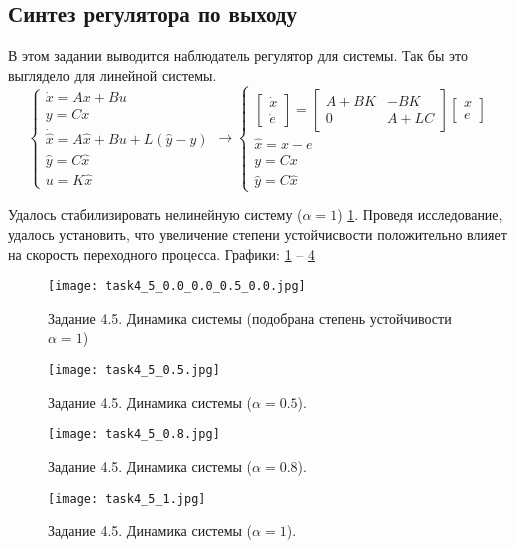 \subsection{Синтез регулятора по выходу}
В этом задании выводится наблюдатель регулятор для системы. Так бы это выглядело для линейной системы.
\[
        \begin{cases}
                \dot{x} = A x + B u\\
                y = C x \\
                \dot{\hat{x}} = A \hat{x} + B u + L(\hat{y} - y) \\
                \hat{y} = C \hat{x} \\
                u = K \hat{x}
        \end{cases} \rightarrow
        \begin{cases}
            \begin{bmatrix} 
                \dot{x} \\
                \dot{e}
            \end{bmatrix} = 
            \begin{bmatrix} 
                A + BK & -BK\\
                0 & A + LC
            \end{bmatrix}
            \begin{bmatrix} 
              x \\
              e
          \end{bmatrix} 
            \\
            \hat{x} = x - e \\
            y = Cx \\
            \hat{y} = C \hat{x}
         \end{cases}
\]

Удалось стабилизировать нелинейную систему ($\alpha = 1$) \ref{fig:task4_5}.
Проведя исследование, удалось установить, что увеличение степени устойчисвости положительно влияет на скорость переходного процесса.
Графики: \ref{fig:task4_5} -- \ref{fig:task4_5_3}
\begin{figure}[]
    \centering
    \texttt{[image: task4\_5\_0.0\_0.0\_0.5\_0.0.jpg]}
    \caption{Задание 4.5. Динамика системы (подобрана степень устойчивости $\alpha=1$)}
    \label{fig:task4_5}
\end{figure}
\begin{figure}[]
    \centering
    \texttt{[image: task4\_5\_0.5.jpg]}
    \caption{Задание 4.5. Динамика системы ($\alpha=0.5$).}
    \label{fig:task4_5_1}
\end{figure}
\begin{figure}[]
    \centering
    \texttt{[image: task4\_5\_0.8.jpg]}
    \caption{Задание 4.5. Динамика системы ($\alpha=0.8$).}
    \label{fig:task4_5_2}
\end{figure}
\begin{figure}[]
    \centering
    \texttt{[image: task4\_5\_1.jpg]}
    \caption{Задание 4.5. Динамика системы ($\alpha=1$).}
    \label{fig:task4_5_3}
\end{figure}


